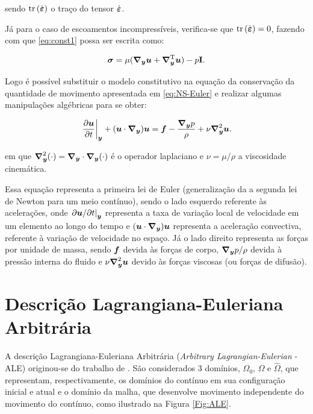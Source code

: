 \noindent sendo $\mathop{\mathrm{tr}}\nolimits{(\dot{\boldsymbol{\varepsilon}})}$ o traço do tensor $\dot{\boldsymbol{\varepsilon}}$.

Já para o caso de escoamentos incompressíveis, verifica-se que $\mathop{\mathrm{tr}}\nolimits{(\dot{\boldsymbol{\varepsilon}})}=0$, fazendo com que \eqref{eq:const1} possa ser escrita como:

\begin{equation}
    \boldsymbol{\sigma}=\mu(\boldsymbol{\nabla_y}\boldsymbol{u}+\boldsymbol{\nabla}^{\mathrm{T}}_{\boldsymbol{y}}\boldsymbol{u})-p\mathbf{I}\text{.}\label{eq:ModConst}
\end{equation}

Logo é possível substituir o modelo constitutivo na equação da conservação da quantidade de movimento apresentada em \eqref{eq:NS-Euler} e realizar algumas manipulações algébricas para se obter:

\begin{equation}
    \left.\frac{\partial \boldsymbol{u}}{\partial t}\right|_{\boldsymbol{y}}+(\boldsymbol{u}\cdot\boldsymbol{\nabla_y})\boldsymbol{u}=\boldsymbol{f}-\frac{\boldsymbol{\nabla_y} p}{\rho}+\nu\boldsymbol{\nabla}^2_{\boldsymbol{y}}\boldsymbol{u}\text{.}
    \label{eq:NS-ALE-2}
\end{equation}

\noindent em que $\boldsymbol{\nabla}^2_{\boldsymbol{y}}(\cdot)=\boldsymbol{\nabla_y}\cdot\boldsymbol{\nabla_y}(\cdot)$ é o operador laplaciano e $\nu=\mu/\rho$ a viscosidade cinemática.

Essa equação representa a primeira lei de Euler (generalização da a segunda lei de Newton para um meio contínuo), sendo o lado esquerdo referente às acelerações, onde $\left.\partial\boldsymbol{u}/\partial t\right|_{\boldsymbol{y}}$ representa a taxa de variação local de velocidade em um elemento ao longo do tempo e $(\boldsymbol{u}\cdot\boldsymbol{\nabla_y})\boldsymbol{u}$ representa a aceleração convectiva, referente à variação de velocidade no espaço. Já o lado direito representa as forças por unidade de massa, sendo $\boldsymbol{f}$ devida às forças de corpo, $\boldsymbol{\nabla_y} p/\rho$ devida à pressão interna do fluido e $\nu\boldsymbol{\nabla}^2_{\boldsymbol{y}}\boldsymbol{u}$ devido às forças viscosas (ou forças de difusão).

\section{Descrição Lagrangiana-Euleriana Arbitrária} \label{CFD-ALE}

A descrição Lagrangiana-Euleriana Arbitrária (\textit{Arbitrary Lagrangian-Eulerian} - ALE) originou-se do trabalho de . São considerados 3 domínios, $\Omega_0$, $\Omega$ e $\hat{\Omega}$, que representam, respectivamente, os domínios do contínuo em sua configuração inicial e atual e o domínio da malha, que desenvolve movimento independente do movimento do contínuo, como ilustrado na Figura \ref{Fig:ALE}.


